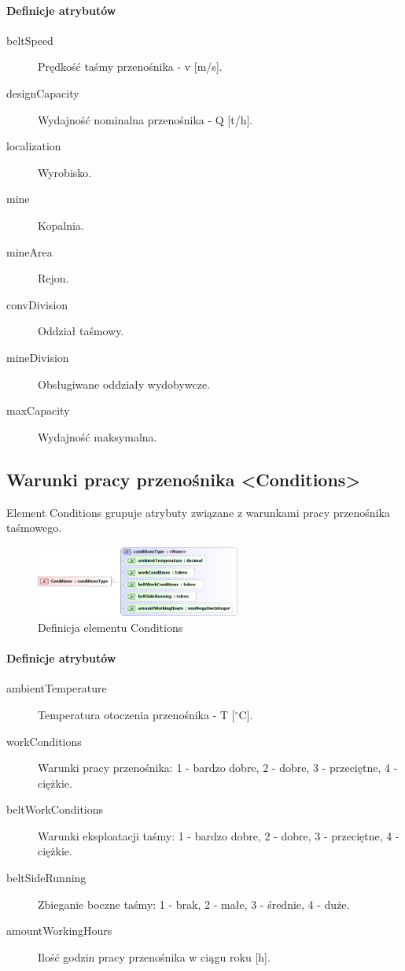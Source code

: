 \documentclass[12pt,a4paper]{article}
\begin{document}
\paragraph{Definicje atrybutów}
\begin{description}
\item[beltSpeed] Prędkość taśmy przenośnika - v [m/s].
\item[designCapacity] Wydajność nominalna przenośnika - Q [t/h].
\item[localization] Wyrobisko.
\item[mine] Kopalnia.
\item[mineArea] Rejon.
\item[convDivision] Oddział taśmowy.
\item[mineDivision] Obsługiwane oddziały wydobywcze.
\item[maxCapacity] Wydajność maksymalna.
\end{description}


\subsection{Warunki pracy przenośnika <Conditions>}
Element Conditions grupuje atrybuty związane z warunkami pracy przenośnika
taśmowego.

\begin{figure}[h]
  \centering
  \includegraphics[width=0.6\textwidth]{png/conditions_xsd2}
  \caption{Definicja elementu Conditions}
  \label{fig:conditions-xsd}
\end{figure}

\paragraph{Definicje atrybutów}
\begin{description}
\item[ambientTemperature] Temperatura otoczenia przenośnika - T [$^\circ$C].
\item[workConditions] Warunki pracy przenośnika: 1 - bardzo dobre, 2 - dobre,
  3 - przeciętne, 4 - ciężkie.
\item[beltWorkConditions] Warunki eksploatacji taśmy: 1 - bardzo dobre,
  2 - dobre, 3 - przeciętne, 4 - ciężkie.
\item[beltSideRunning] Zbieganie boczne taśmy: 1 - brak, 2 - małe, 3 - średnie,
  4 - duże.
\item[amountWorkingHours] Ilość godzin pracy przenośnika w ciągu roku [h].
\end{description}
\end{document}
